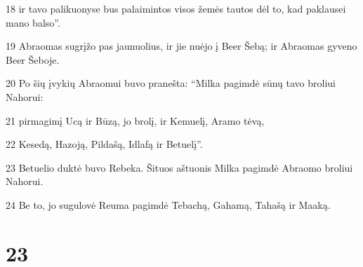 \par 18 ir tavo palikuonyse bus palaimintos visos žemės tautos dėl to, kad paklausei mano balso”. 
\par 19 Abraomas sugrįžo pas jaunuolius, ir jie nuėjo į Beer Šebą; ir Abraomas gyveno Beer Šeboje. 
\par 20 Po šių įvykių Abraomui buvo pranešta: “Milka pagimdė sūnų tavo broliui Nahorui: 
\par 21 pirmagimį Ucą ir Būzą, jo brolį, ir Kemuelį, Aramo tėvą, 
\par 22 Kesedą, Hazoją, Pildašą, Idlafą ir Betuelį”. 
\par 23 Betuelio duktė buvo Rebeka. Šituos aštuonis Milka pagimdė Abraomo broliui Nahorui. 
\par 24 Be to, jo sugulovė Reuma pagimdė Tebachą, Gahamą, Tahašą ir Maaką.



\chapter{23}


